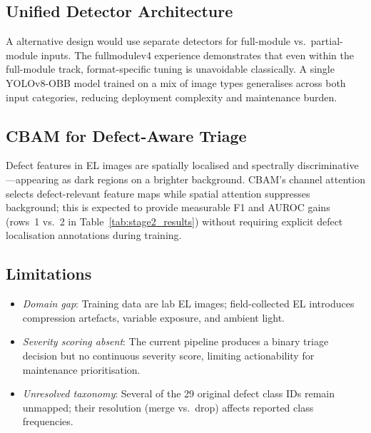 \documentclass[conference]{IEEEtran}
\begin{document}
\subsection{Unified Detector Architecture}

A alternative design would use separate detectors for
full-module vs.\ partial-module inputs.
The fullmodulev4 experience demonstrates that even within the
full-module track, format-specific tuning is unavoidable
classically.
A single YOLOv8-OBB model trained on a mix of image types
generalises across both input categories, reducing deployment
complexity and maintenance burden.

\subsection{CBAM for Defect-Aware Triage}

Defect features in EL images are spatially localised and
spectrally discriminative---appearing as dark regions on a
brighter background.
CBAM's channel attention selects defect-relevant feature maps
while spatial attention suppresses background; this is
expected to provide measurable F1 and AUROC gains (rows~1
vs.~2 in Table~\ref{tab:stage2_results}) without requiring
explicit defect localisation annotations during training.

\subsection{Limitations}

\begin{itemize}
  \item \textit{Domain gap}: Training data are lab EL images;
        field-collected EL introduces compression artefacts,
        variable exposure, and ambient light.
  \item \textit{Severity scoring absent}: The current pipeline
        produces a binary triage decision but no continuous
        severity score, limiting actionability for maintenance
        prioritisation.
  \item \textit{Unresolved taxonomy}: Several of the 29
        original defect class IDs remain unmapped; their
        resolution (merge vs.\ drop) affects reported class
        frequencies.
\end{itemize}

\end{document}
